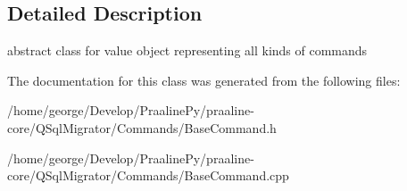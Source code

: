 \subsection{Detailed Description}
abstract class for value object representing all kinds of commands 

The documentation for this class was generated from the following files\+:\begin{DoxyCompactItemize}
\item 
/home/george/\+Develop/\+Praaline\+Py/praaline-\/core/\+Q\+Sql\+Migrator/\+Commands/Base\+Command.\+h\item 
/home/george/\+Develop/\+Praaline\+Py/praaline-\/core/\+Q\+Sql\+Migrator/\+Commands/Base\+Command.\+cpp\end{DoxyCompactItemize}
